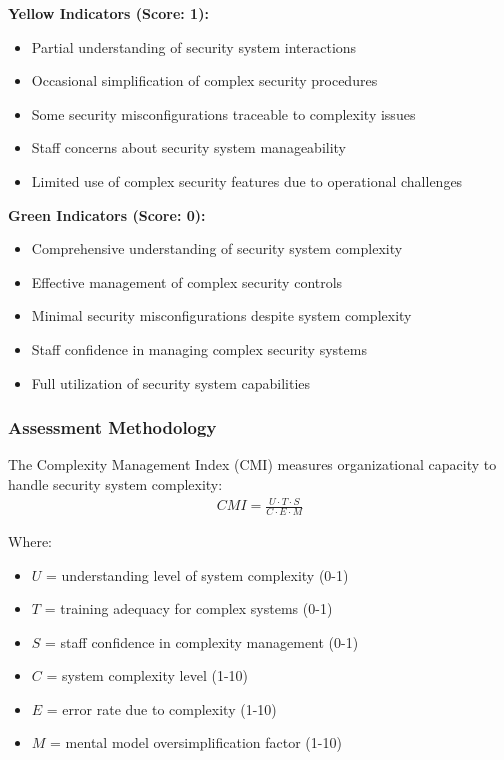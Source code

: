 \documentclass[11pt,a4paper]{article}
\begin{document}
\textbf{Yellow Indicators (Score: 1):}
\begin{itemize}
\item Partial understanding of security system interactions
\item Occasional simplification of complex security procedures
\item Some security misconfigurations traceable to complexity issues
\item Staff concerns about security system manageability
\item Limited use of complex security features due to operational challenges
\end{itemize}

\textbf{Green Indicators (Score: 0):}
\begin{itemize}
\item Comprehensive understanding of security system complexity
\item Effective management of complex security controls
\item Minimal security misconfigurations despite system complexity
\item Staff confidence in managing complex security systems
\item Full utilization of security system capabilities
\end{itemize}

\subsubsection{Assessment Methodology}

The Complexity Management Index (CMI) measures organizational capacity to handle security system complexity:
\begin{align}
CMI = \frac{U \cdot T \cdot S}{C \cdot E \cdot M}
\end{align}

Where:
\begin{itemize}
\item $U$ = understanding level of system complexity (0-1)
\item $T$ = training adequacy for complex systems (0-1)
\item $S$ = staff confidence in complexity management (0-1)
\item $C$ = system complexity level (1-10)
\item $E$ = error rate due to complexity (1-10)
\item $M$ = mental model oversimplification factor (1-10)
\end{itemize}
\end{document}

